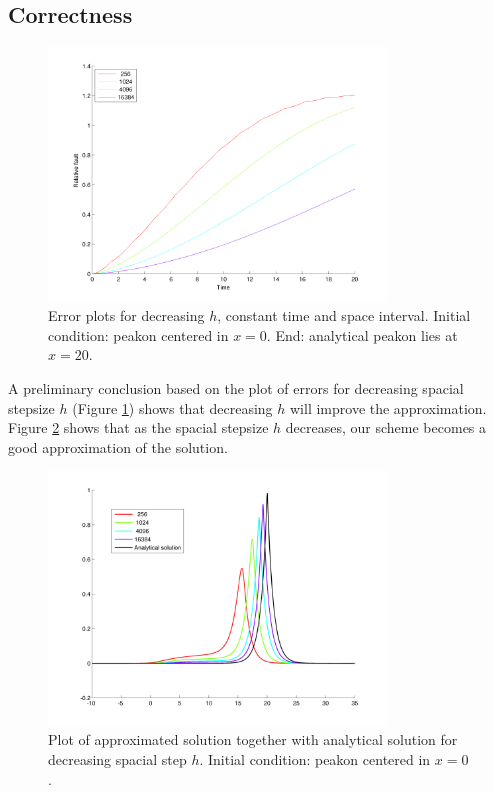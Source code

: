 \subsection*{Correctness}

\begin{figure}[h]
        \centering
        \includegraphics[width=0.8\textwidth]{gfx/erroroftime}
        \caption{Error plots for decreasing $h$, constant time and space interval. Initial condition: peakon centered in $x = 0$. End: analytical peakon lies at $x = 20$.}
        \label{fig:erroroftime}
\end{figure}
A preliminary conclusion based on the plot of errors for decreasing spacial stepsize $h$ (Figure \ref{fig:erroroftime}) shows that decreasing $h$ will improve the approximation. Figure \ref{fig:attimeT} shows that as the spacial stepsize $h$ decreases, our scheme becomes a good approximation of the solution. \\

\begin{figure}[h]
        \centering
        \includegraphics[width=0.8\textwidth]{gfx/attimeT}
        \caption{Plot of approximated solution together with analytical solution for decreasing spacial step $h$. Initial condition: peakon centered in $x = 0$.}
        \label{fig:attimeT}
\end{figure}

